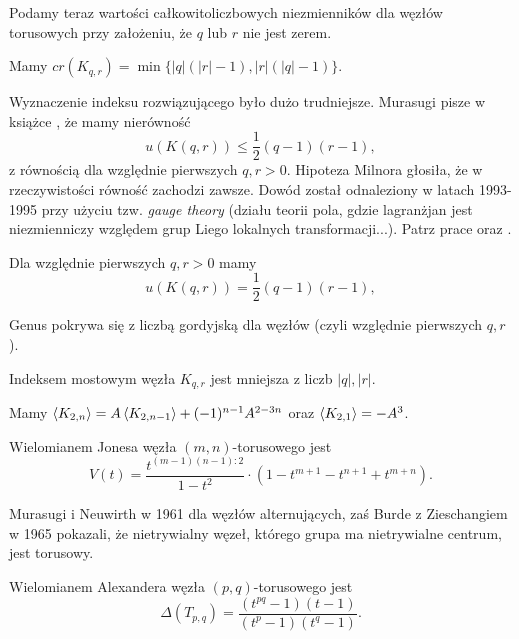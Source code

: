 Podamy teraz wartości całkowitoliczbowych niezmienników dla węzłów torusowych przy założeniu, że $q$ lub $r$ nie jest zerem.

\begin{proposition}[Murasugi, 1991]
    Mamy $cr(K_{q,r}) = \min\{|q|(|r| -1), |r|(|q|-1)\}$.
\end{proposition}

Wyznaczenie indeksu rozwiązującego było dużo trudniejsze.
Murasugi pisze w książce \cite{murasugi96}, że mamy nierówność
\[
    u(K(q, r)) \le \frac 12 (q-1)(r-1),
\]
z równością dla względnie pierwszych $q, r > 0$.
Hipoteza Milnora głosiła, że w rzeczywistości równość zachodzi zawsze.
Dowód został odnaleziony w latach 1993-1995 przy użyciu tzw. \emph{gauge theory} (działu teorii pola, gdzie lagranżjan jest niezmienniczy względem grup Liego lokalnych transformacji...).
Patrz prace \cite{kronheimer93} oraz \cite{kronheimer95}.

\begin{proposition} \label{torus_unknotting}
    Dla względnie pierwszych $q, r > 0$ mamy
    \[
        u(K(q, r)) = \frac 12 (q-1)(r-1),
    \]
\end{proposition}

Genus pokrywa się z liczbą gordyjską dla węzłów (czyli względnie pierwszych $q, r$).

\begin{proposition} \label{torus_bridge}
    Indeksem mostowym węzła $K_{q,r}$ jest mniejsza z liczb $|q|, |r|$.
\end{proposition}

\begin{proposition}
    Mamy $\left\langle{K_{2, n}}\right\rangle = A \left\langle{K_{2,n-1}}\right\rangle + (-1)^{n-1} A^{2-3n}$
    oraz $\left\langle{K_{2,1}}\right\rangle = -A^3$.
\end{proposition}

\begin{proposition}
    Wielomianem Jonesa węzła $(m, n)$-torusowego jest
    \[
        V(t) = \frac {t^{(m-1)(n-1):2}}{1-t^2} \cdot (1 - t^{m+1} - t^{n+1} + t^{m+n}).
    \]
\end{proposition}

Murasugi i Neuwirth w 1961 dla węzłów alternujących,
zaś Burde z Zieschangiem w 1965 pokazali, że nietrywialny węzeł,
którego grupa ma nietrywialne centrum, jest torusowy.

\begin{proposition}
    Wielomianem Alexandera węzła $(p,q)$-torusowego jest
    \[
         \Delta(T_{p,q}) = \frac{(t^{pq}-1)(t-1)}{(t^p-1)(t^q-1)}.
    \]
\end{proposition}

